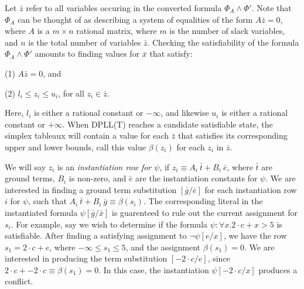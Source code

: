 \documentclass{llncs}
\begin{document}
Let $\bar{z}$ refer to all variables occuring in the converted formula $\Phi_A \wedge \Phi'$.
Note that $\Phi_A$ can be thought of as describing a system of equalities of the form $A \bar{z} = 0$, where $A$ is a $m \times n$ rational matrix, where $m$ is the number of slack variables, and $n$ is the total number of variables $\bar{z}$.
Checking the satisfiability of the formula $\Phi_A \wedge \Phi'$ amounts to finding values for $\bar{x}$ that satisfy:

(1) $A \bar{z} = 0$, and

(2) $l_i \leq z_i \leq u_i$, for all $z_i \in \bar{z}$.

Here, $l_i$ is either a rational constant or $- \infty$, and likewise $u_i$ is either a rational constant or $+ \infty$.
When DPLL(T) reaches a candidate satisfiable state, the simplex tableaux will contain a value for each $\bar{z}$ that satisfies its corresponding upper and lower bounds, call this value $\beta( z_i )$ for each $z_i$ in $\bar{z}$.

We will say $z_i$ is an \emph{instantiation row for $\psi$}, if $z_i \equiv A_i\ \bar{t} + B_i\ \bar{e}$, where $\bar{t}$ are ground terms, $B_i$ is non-zero, and $\bar{e}$ are the instantiation constants for $\psi$.
We are interested in finding a ground term substitution $[\bar{g}/\bar{e}]$ for each instantiation row $i$ for $\psi$, such that $A_i\ \bar{t} + B_i\ \bar{g} \equiv \beta( s_i )$.
The corresponding literal in the instantiated formula $\psi[\bar{g}/\bar{x}]$ is guarenteed to rule out the current assignment for $s_i$.
For example, say we wish to determine if the formula $\psi : \forall x. 2 \cdot c + x > 5$ is satisfiable.
After finding a satisfying assignment to $\neg \psi[e/x]$, we have the row $s_1 = 2 \cdot c + e$, where $- \infty \leq s_1 \leq 5$, and the assignment $\beta( s_1 ) = 0$.
We are interested in producing the term substitution $[-2 \cdot c/e]$, since $2 \cdot c + -2 \cdot c \equiv \beta( s_1 ) = 0$.
In this case, the instantiation $\psi[-2 \cdot c/x]$ produces a conflict.
\end{document}
